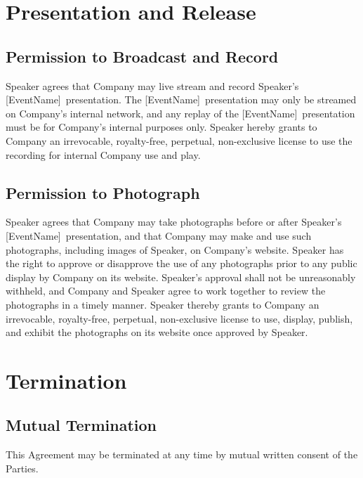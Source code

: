 \documentclass[a4paper,12pt]{article} %
\newcommand{\EventName}{[EventName]}
\begin{document}
\section{Presentation and Release}

\subsection{Permission to Broadcast and Record}

Speaker agrees that Company may live stream and record Speaker's \EventName ~presentation. The \EventName ~presentation may only be streamed on Company's internal network, and any replay of the \EventName ~presentation must be for Company's internal purposes only. Speaker hereby grants to Company an irrevocable, royalty-free, perpetual, non-exclusive license to use the recording for internal Company use and play.

\subsection{Permission to Photograph}

Speaker agrees that Company may take photographs before or after Speaker's \EventName ~presentation, and that Company may make and use such photographs, including images of Speaker, on Company's website. Speaker has the right to approve or disapprove the use of any photographs prior to any public display by Company on its website. Speaker's approval shall not be unreasonably withheld, and Company and Speaker agree to work together to review the photographs in a timely manner. Speaker thereby grants to Company an irrevocable, royalty-free, perpetual, non-exclusive license to use, display, publish, and exhibit the photographs on its website once approved by Speaker.


\section{Termination}

\subsection{Mutual Termination}

This Agreement may be terminated at any time by mutual written consent of the Parties.
\end{document}
